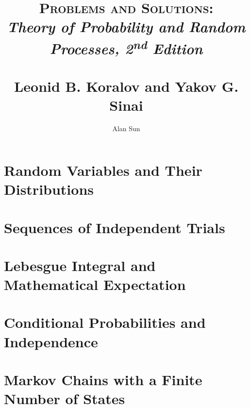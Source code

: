\documentclass{report}
\title{\textsc{Problems and Solutions:} \\ 
\textit{Theory of Probability and Random Processes, 2\textsuperscript{nd} Edition} \\ 
~\\ \large Leonid B. Koralov and Yakov G. Sinai}
\author{Alan Sun}
\date{}
\begin{document}
\maketitle

\chapter{Random Variables and Their Distributions}

\chapter{Sequences of Independent Trials}

\chapter{Lebesgue Integral and Mathematical Expectation}

\chapter{Conditional Probabilities and Independence}


\chapter{Markov Chains with a Finite Number of States}

\end{document}
